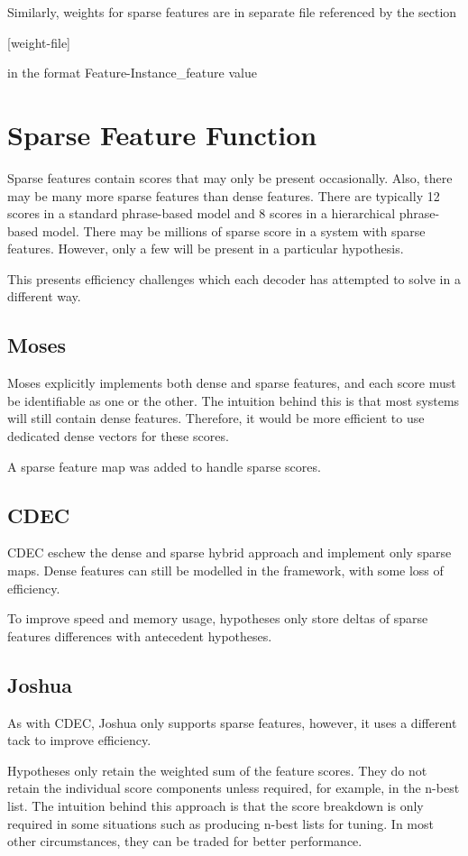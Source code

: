 \documentclass{pbml}
\begin{document}
Similarly, weights for sparse features are in separate file referenced by the section

  [weight-file]

in the format
  Feature-Instance\_feature value
  
\section{Sparse Feature Function}

Sparse features contain scores that may only be present occasionally. Also, there may be many more sparse features than dense features. There are typically 12 scores in a standard phrase-based model and 8 scores in a hierarchical phrase-based model. There may be millions of sparse score in a system with sparse features. However, only a few will be present in a particular hypothesis.

This presents efficiency challenges which each decoder has attempted to solve in a different way.

\subsection{Moses}
Moses explicitly implements both dense and sparse features, and each score must be identifiable as one or the other.
The intuition behind this is that most systems will still contain dense features. Therefore, it would be more efficient to use dedicated dense vectors for these scores.

A sparse feature map was added to handle sparse scores.

\subsection{CDEC}
CDEC eschew the dense and sparse hybrid approach and implement only sparse maps. Dense features can still be modelled in the framework, with some loss of efficiency.

To improve speed and memory usage, hypotheses only store deltas of sparse features differences with antecedent hypotheses.

\subsection{Joshua}
As with CDEC, Joshua only supports sparse features, however, it uses a different tack to improve efficiency.

Hypotheses only retain the weighted sum of the feature scores. They do not retain the individual score components unless required, for example, in the n-best list. The intuition behind this approach is that the score breakdown is only required in some situations such as producing n-best lists for tuning. In most other circumstances, they can be traded for better performance.
  
\end{document}
